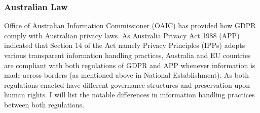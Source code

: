     \subsubsection{Australian Law}
      \par Office of Australian Information Commissioner (OAIC) \parencite{Ian6} has provided how GDPR comply with Australian privacy laws. As Australia Privacy Act 1988 (APP) indicated that Section 14 of the Act namely Privacy Principles (IPPs) adopts various transparent information handling practices, Australia and EU countries are compliant with both regulations of GDPR and APP whenever information is made across borders (as mentioned above in National Establishment). As both regulations enacted have different governance structures and preservation upon human rights. I will list the notable differences in information handling practices between both regulations.

